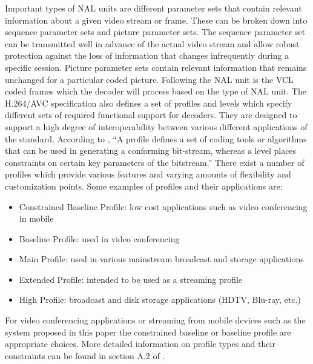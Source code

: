 \documentclass[a4paper,12pt]{article}
\begin{document}
Important types of NAL units are different parameter sets that contain relevant information about a given video stream or frame. These can be broken down into sequence parameter sets and picture parameter sets. The sequence parameter set can be transmitted well in advance of the actual video stream and allow robust protection against the loss of information that changes infrequently during a specific session. Picture parameter sets contain relevant information that remains unchanged for a particular coded picture. Following the NAL unit is the VCL coded frames which the decoder will process based on the type of NAL unit. The H.264/AVC specification also defines a set of profiles and levels which specify different sets of required functional support for decoders. They are designed to support a high degree of interoperability between various different applications of the standard. According to \cite{H264AVCOverview}, ``A profile defines a set of coding tools or algorithms that can be used in generating a conforming bit-stream, whereas a level places constraints on certain key parameters of the bitstream.'' There exist a number of profiles which provide various features and varying amounts of flexibility and customization points. Some examples of profiles and their applications are:
\begin{itemize}
\item Constrained Baseline Profile: low cost applications such as video conferencing in mobile
\item Baseline Profile: used in video conferencing
\item Main Profile: used in various mainstream broadcast and storage applications
\item  Extended Profile: intended to be used as a streaming profile
\item  High Profile: broadcast and disk storage applications (HDTV, Blu-ray, etc.)
\end{itemize}
For video conferencing applications or streaming from mobile devices such as the system proposed in this paper the constrained baseline or baseline profile are appropriate choices. More detailed information on profile types and their constraints can be found in section A.2 of \cite{H264Spec}.
\end{document}
